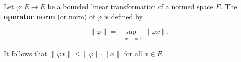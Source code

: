 Let $\varphi: E \to E$ be a bounded linear transformation of a normed space $E$. The \textbf{operator norm} (or norm) of $\varphi$ is defined by

$$\|\varphi\| = \sup_{\|x\| = 1} \|\varphi x\|.$$

It follows that $\|\varphi x\| \leq \|\varphi\| \cdot \|x\|$ for all $x \in E$.
